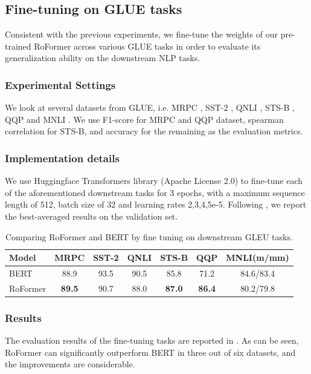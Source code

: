 \documentclass{article}
\begin{document}
\subsection{Fine-tuning on GLUE tasks}\label{subsec:glue}
Consistent with the previous experiments, we fine-tune the weights of our pre-trained RoFormer across various GLUE tasks in order to evaluate its generalization ability on the downstream NLP tasks. 

\subsubsection{Experimental Settings} 
We look at several datasets from GLUE, i.e. MRPC \cite{mrpc}, SST-2 \cite{sst2}, QNLI \cite{qnli}, STS-B \cite{stsb}, QQP \cite{qqp} and MNLI \cite{mnli}. We use F1-score for MRPC and QQP dataset, spearman correlation for STS-B, and accuracy for the remaining as the evaluation metrics.

\subsubsection{Implementation details} 
We use Huggingface Transformers library (Apache License 2.0)\cite{wolf-etal-2020-transformers} to fine-tune each of the aforementioned downstream tasks for 3 epochs, with a maximum sequence length of 512, batch size of 32 and learning rates {2,3,4,5}e-5. Following \cite{Devlin2019BERTPO},  we report the best-averaged results on the validation set.
\begin{table}[hbt]
	\caption{Comparing RoFormer and BERT by fine tuning on downstream GLEU tasks.}
	\label{tb:glue-eval}
	\centering
	\begin{tabular}{lcccccc}
		\toprule
		Model & MRPC & SST-2 & QNLI & STS-B & QQP & MNLI(m/mm)\\ 
		\midrule
		BERT\cite{Devlin2019BERTPO} & 88.9 & 93.5 & 90.5 & 85.8 & 71.2 & 84.6/83.4\\
		RoFormer & \textbf{89.5}& 90.7 & 88.0 & \textbf{87.0} & \textbf{86.4} & 80.2/79.8 \\
		\bottomrule
	\end{tabular}
\end{table}
\subsubsection{Results} 
The evaluation results of the fine-tuning tasks are reported in . As can be seen, RoFormer can significantly outperform  BERT in three out of six datasets, and the improvements are considerable. 
\end{document}
